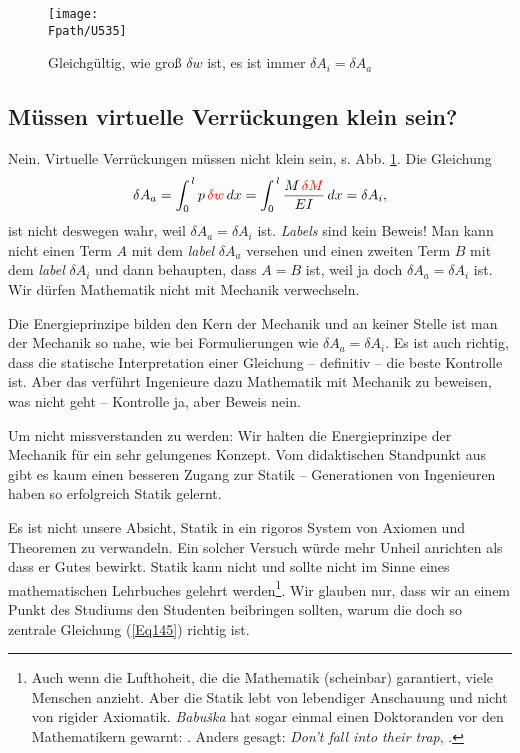 {{{{{%
\begin{figure}[tbp]
\centering
\if {} \sidecaption \fi
\texttt{[image: \\Fpath/U535]}
\caption{Gleichg\"{u}ltig, wie gro{\ss} $\delta w$ ist, es ist immer $\delta A_i = \delta A_a$} \label{U535}
\end{figure}%
{\textcolor{sectionTitleBlue}{\section{M\"{u}ssen virtuelle Verr\"{u}ckungen klein sein?}}}
Nein. Virtuelle Verr\"{u}ckungen m\"{u}ssen nicht klein sein, s. Abb. \ref{U535}. Die Gleichung
\begin{align} \label{Eq145}
\delta A_a = \int_0^{\,l} p\,\textcolor{red}{\delta w}\,dx = \int_0^{\,l} \frac{M\,\textcolor{red}{\delta M}}{EI} \,dx = \delta A_i,
\end{align}
ist nicht deswegen wahr, weil $\delta A_a = \delta A_i$ ist. {\em Labels\/} sind kein Beweis! Man kann nicht einen Term $A$ mit dem {\em label\/} $\delta A_a$ versehen und einen zweiten Term $B$ mit dem {\em label\/} $\delta A_i$ und dann behaupten, dass $A = B$ ist, weil ja doch $\delta A_a = \delta A_i$ ist. Wir d\"{u}rfen Mathematik nicht mit Mechanik verwechseln.

Die Energieprinzipe bilden den Kern der Mechanik und an keiner Stelle ist man der Mechanik so nahe, wie bei Formulierungen wie $\delta A_a = \delta A_i$. Es ist auch richtig, dass die statische Interpretation einer Gleichung -- definitiv -- die beste Kontrolle ist. Aber das verf\"{u}hrt Ingenieure dazu Mathematik mit Mechanik zu beweisen, was nicht geht -- Kontrolle ja, aber Beweis nein.

Um nicht missverstanden zu werden: Wir halten die Energieprinzipe der Mechanik f\"{u}r ein sehr gelungenes Konzept. Vom didaktischen Standpunkt aus gibt es kaum einen besseren Zugang zur Statik --  Generationen von Ingenieuren haben so erfolgreich Statik gelernt.

Es ist nicht unsere Absicht, Statik in ein rigoros System von Axiomen und Theoremen zu verwandeln. Ein solcher Versuch w\"{u}rde mehr Unheil anrichten als dass er Gutes bewirkt. Statik kann nicht und sollte nicht im Sinne eines mathematischen Lehrbuches gelehrt werden\footnote{Auch wenn die  Lufthoheit, die die Mathematik (scheinbar) garantiert, viele Menschen anzieht. Aber die Statik lebt von lebendiger Anschauung und nicht von rigider Axiomatik. {\em Babu\v{s}ka\/} hat sogar einmal einen Doktoranden vor den Mathematikern gewarnt: \grq{}. Anders gesagt: {\em Don't fall into their trap\/}, \cite{Babuska6}. }. Wir glauben nur, dass wir an einem Punkt des Studiums den Studenten beibringen sollten, warum die doch so zentrale Gleichung (\ref{Eq145}) richtig ist.

}}}}}
